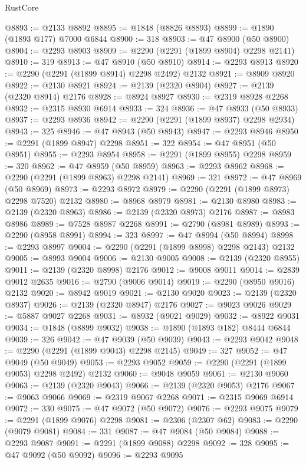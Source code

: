 \begin{lexlean}{RustCore}
\begin{coremodule}
@8893 := @2133 @8892
@8895 := @1848 (@8826 @8893)
@8899 := @1890 (@1893 @177) @7000 @6844
@8900 := 318
@8903 := @47 @8900 (@50 @8900)
@8904 := @2293 @8903
@8909 := @2290 (@2291 (@1899 @8904) @2298 @2141)
@8910 := 319
@8913 := @47 @8910 (@50 @8910)
@8914 := @2293 @8913
@8920 := @2290 (@2291 (@1899 @8914) @2298 @2492) @2132
@8921 := @8909 @8920
@8922 := @2130 @8921
@8924 := @2139 (@2320 @8904)
@8927 := @2139 (@2320 @8914) @2176
@8928 := @8924 @8927
@8930 := @2319 @8928 @2268
@8932 := @2315 @8930 @6914
@8933 := 324
@8936 := @47 @8933 (@50 @8933)
@8937 := @2293 @8936
@8942 := @2290 (@2291 (@1899 @8937) @2298 @2934)
@8943 := 325
@8946 := @47 @8943 (@50 @8943)
@8947 := @2293 @8946
@8950 := @2291 (@1899 @8947) @2298
@8951 := 322
@8954 := @47 @8951 (@50 @8951)
@8955 := @2293 @8954
@8958 := @2291 (@1899 @8955) @2298
@8959 := 320
@8962 := @47 @8959 (@50 @8959)
@8963 := @2293 @8962
@8968 := @2290 (@2291 (@1899 @8963) @2298 @2141)
@8969 := 321
@8972 := @47 @8969 (@50 @8969)
@8973 := @2293 @8972
@8979 := @2290 (@2291 (@1899 @8973) @2298 @7520) @2132
@8980 := @8968 @8979
@8981 := @2130 @8980
@8983 := @2139 (@2320 @8963)
@8986 := @2139 (@2320 @8973) @2176
@8987 := @8983 @8986
@8989 := @7528 @8987 @2268
@8991 := @2790 (@8981 @8989)
@8993 := @2290 (@8958 @8991)
@8994 := 323
@8997 := @47 @8994 (@50 @8994)
@8998 := @2293 @8997
@9004 := @2290 (@2291 (@1899 @8998) @2298 @2143) @2132
@9005 := @8993 @9004
@9006 := @2130 @9005
@9008 := @2139 (@2320 @8955)
@9011 := @2139 (@2320 @8998) @2176
@9012 := @9008 @9011
@9014 := @2839 @9012 @2635
@9016 := @2790 (@9006 @9014)
@9019 := @2290 (@8950 @9016) @2132
@9020 := @8942 @9019
@9021 := @2130 @9020
@9023 := @2139 (@2320 @8937)
@9026 := @2139 (@2320 @8947) @2176
@9027 := @9023 @9026
@9029 := @5887 @9027 @2268
@9031 := @8932 (@9021 @9029)
@9032 := @8922 @9031
@9034 := @1848 (@8899 @9032)
@9038 := @1890 (@1893 @182) @8444 @6844
@9039 := 326
@9042 := @47 @9039 (@50 @9039)
@9043 := @2293 @9042
@9048 := @2290 (@2291 (@1899 @9043) @2298 @2145)
@9049 := 327
@9052 := @47 @9049 (@50 @9049)
@9053 := @2293 @9052
@9059 := @2290 (@2291 (@1899 @9053) @2298 @2492) @2132
@9060 := @9048 @9059
@9061 := @2130 @9060
@9063 := @2139 (@2320 @9043)
@9066 := @2139 (@2320 @9053) @2176
@9067 := @9063 @9066
@9069 := @2319 @9067 @2268
@9071 := @2315 @9069 @6914
@9072 := 330
@9075 := @47 @9072 (@50 @9072)
@9076 := @2293 @9075
@9079 := @2291 (@1899 @9076) @2298
@9081 := @2306 (@2307 @62)
@9083 := @2290 (@9079 @9081)
@9084 := 331
@9087 := @47 @9084 (@50 @9084)
@9088 := @2293 @9087
@9091 := @2291 (@1899 @9088) @2298
@9092 := 328
@9095 := @47 @9092 (@50 @9092)
@9096 := @2293 @9095

\end{coremodule}
\end{lexlean}
